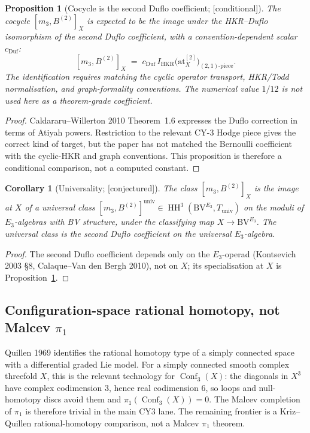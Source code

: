 \documentclass[11pt,reqno]{amsart}
\theoremstyle{plain}
\newtheorem{proposition}[theorem]{Proposition}
\newtheorem{corollary}[theorem]{Corollary}
\theoremstyle{definition}
\theoremstyle{remark}
\providecommand{\ClaimStatusConjectured}{\textnormal{[conjectured]}}
\providecommand{\ClaimStatusConditional}{\textnormal{[conditional]}}
\DeclareMathOperator{\Conf}{Conf}
\DeclareMathOperator{\HH}{HH}
\newcommand{\at}{\mathrm{at}}
\begin{document}
\begin{proposition}[Cocycle is the second Duflo coefficient; \ClaimStatusConditional]
\label{prop:cocycle-duflo}
The cocycle $[m_3, B^{(2)}]_X$ is expected to be the image under the HKR--Duflo isomorphism of the second Duflo coefficient, with a convention-dependent scalar $c_{\mathrm{Duf}}$:
\[
  [m_3, B^{(2)}]_X \;=\; c_{\mathrm{Duf}}\,
  I_{\mathrm{HKR}}\bigl(\at_X^{[2]}\bigr)_{(2,1)\text{-piece}} .
\]
The identification requires matching the cyclic operator transport,
HKR/Todd normalisation, and graph-formality conventions. The numerical
value $1/12$ is not used here as a theorem-grade coefficient.
\end{proposition}

\begin{proof}
Caldararu--Willerton 2010 Theorem~1.6 expresses the Duflo correction
in terms of Atiyah powers. Restriction to the relevant CY-$3$ Hodge
piece gives the correct kind of target, but the paper has not matched
the Bernoulli coefficient with the cyclic-HKR and graph conventions.
This proposition is therefore a conditional comparison, not a computed
constant.
\end{proof}

\begin{corollary}[Universality; \ClaimStatusConjectured]
\label{cor:universal}
The class $[m_3, B^{(2)}]_X$ is the image at $X$ of a universal class $[m_3, B^{(2)}]^{\mathrm{univ}} \in \HH^3(\mathrm{BV}^{E_3}, T_{\mathrm{univ}})$ on the moduli of $E_3$-algebras with BV structure, under the classifying map $X \to \mathrm{BV}^{E_3}$. The universal class is the second Duflo coefficient on the universal $E_3$-algebra.
\end{corollary}

\begin{proof}
The second Duflo coefficient depends only on the $E_3$-operad (Kontsevich 2003 \S8, Calaque--Van den Bergh 2010), not on $X$; its specialisation at $X$ is Proposition~\ref{prop:cocycle-duflo}.
\end{proof}

\subsection{Configuration-space rational homotopy, not Malcev $\pi_1$}
\label{sub:malcev-quillen}
Quillen 1969 identifies the rational homotopy type of a simply
connected space with a differential graded Lie model. For a simply
connected smooth complex threefold $X$, this is the relevant
technology for $\Conf_3(X)$: the diagonals in $X^3$ have complex
codimension $3$, hence real codimension $6$, so loops and null-homotopy
discs avoid them and $\pi_1(\Conf_3(X))=0$. The Malcev completion of
$\pi_1$ is therefore trivial in the main CY3 lane. The remaining
frontier is a Kriz--Quillen rational-homotopy comparison, not a
Malcev $\pi_1$ theorem.
\end{document}
